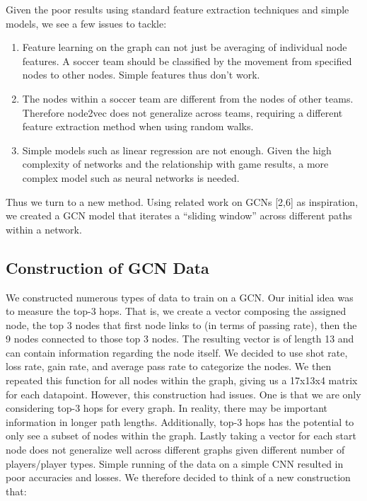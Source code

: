 Given the poor results using standard feature extraction techniques and simple models, we see a few issues to tackle:

\begin{enumerate}

    \item Feature learning on the graph can not just be averaging of individual node features. A soccer team should be classified by the movement from specified nodes to other nodes. Simple features thus don't work. 


    \item The nodes within a soccer team are different from the nodes of other teams. Therefore node2vec does not generalize across teams, requiring a different feature extraction method when using random walks. 


    \item Simple models such as linear regression are not enough. Given the high complexity of networks and the relationship with game results, a more complex model such as neural networks is needed. 

\end{enumerate}

Thus we turn to a new method. Using related work on GCNs [2,6] as inspiration, we created a GCN model that iterates a ``sliding window'' across different paths within a network. 

\subsection{Construction of GCN Data}

We constructed numerous types of data to train on a GCN. Our initial idea was to measure the top-3 hops. That is, we create a vector composing the assigned node, the top 3 nodes that first node links to (in terms of passing rate), then the 9 nodes connected to those top 3 nodes. The resulting vector is of length 13 and can contain information regarding the node itself. We decided to use shot rate, loss rate, gain rate, and average pass rate to categorize the nodes. We then repeated this function for all nodes within the graph, giving us a 17x13x4 matrix for each datapoint. However, this construction had issues. One is that we are only considering top-3 hops for every graph. In reality, there may be important information in longer path lengths. Additionally, top-3 hops has the potential to only see a subset of nodes within the graph. Lastly taking a vector for each start node does not generalize well across different graphs given different number of players/player types. Simple running of the data on a simple CNN resulted in poor accuracies and losses. We therefore decided to think of a new construction that: 


